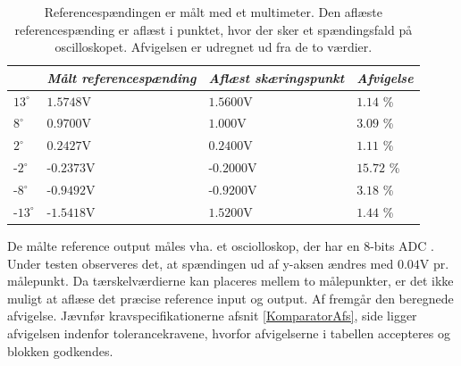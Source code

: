 \begin{table}[H]
\centering
\begin{tabular}{|l|l|l|l|}
\cline{2-4} \multicolumn{1}{l|}{}
           & \textit{Målt referencespænding} & \textit{Aflæst skæringspunkt} & \textit{Afvigelse} \\ \hline
$13^\circ$  & $1.5748$V                      & $1.5600$V                      & $1.14$ \%              \\ \hline
$8^\circ$   & $0.9700$V                      & $1.000$V                       & $3.09$ \%              \\ \hline
$2^\circ$   & $0.2427$V                      & $0.2400$V                      & $1.11$ \%                                    \\ \hline
-$2^\circ$  & -$0.2373$V                     & -$0.2000$V                     & $15.72$ \%                                \\ \hline
-$8^\circ$  & -$0.9492$V                     & -$0.9200$V                     & $3.18$ \%              \\ \hline
-$13^\circ$ & -$1.5418$V                     & $1.5200$V                      & $1.44$ \%              \\ \hline
\end{tabular}
\caption{Referencespændingen er målt med et multimeter. Den aflæste referencespænding er aflæst i punktet, hvor der sker et spændingsfald på oscilloskopet. Afvigelsen er udregnet ud fra de to værdier.}
\label{Tab:test-taendsluk}
\end{table}

\noindent De målte reference output måles vha. et osciolloskop, der har en 8-bits ADC \cite{RIGOL2010}. Under testen observeres det, at spændingen ud af y-aksen ændres med $0.04$V pr. målepunkt. Da tærskelværdierne kan placeres mellem to målepunkter, er det ikke muligt at aflæse det præcise reference input og output. Af  fremgår den beregnede afvigelse. Jævnfør kravspecifikationerne afsnit \ref{KomparatorAfs}, side \pageref{KomparatorAfs} ligger afvigelsen indenfor tolerancekravene, hvorfor afvigelserne i tabellen accepteres og blokken godkendes. 